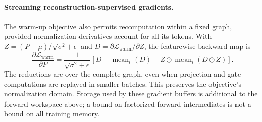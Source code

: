 \paragraph{Streaming reconstruction-supervised gradients.}
The warm-up objective also permits recomputation within a fixed graph, provided normalization derivatives account for all its tokens. With $Z=(P-\mu)/\sqrt{\sigma^2+\epsilon}$ and $D=\partial\mathcal{L}_{\mathrm{warm}}/\partial Z$, the featurewise backward map is
\begin{equation}
    \frac{\partial\mathcal{L}_{\mathrm{warm}}}{\partial P}
    =\frac{1}{\sqrt{\sigma^2+\epsilon}}
    \left[D-\operatorname{mean}_{i}(D)-Z\odot\operatorname{mean}_{i}(D\odot Z)\right].
\end{equation}
The reductions are over the complete graph, even when projection and gate computations are replayed in smaller batches. This preserves the objective's normalization domain. Storage used by these gradient buffers is additional to the forward workspace above; a bound on factorized forward intermediates is not a bound on all training memory.

